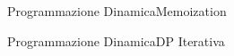 \documentclass{beamer}
\begin{document}
\begin{frame}{Programmazione Dinamica}{Memoization}
\end{frame}
%
\begin{frame}{Programmazione Dinamica}{DP Iterativa}
\end{frame}
%
\end{document}

